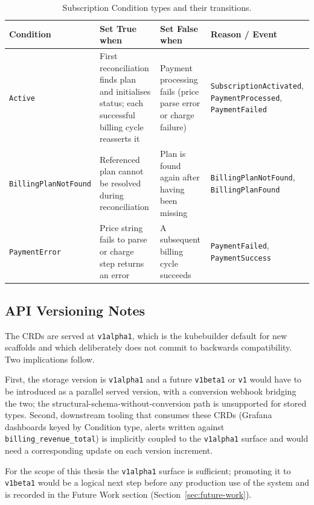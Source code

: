 \begin{table}[h]
\centering
\small
\caption{Subscription Condition types and their transitions.}
\label{tab:conditions}
\begin{tabularx}{\textwidth}{@{}lXXX@{}}
\toprule
\textbf{Condition} & \textbf{Set True when} & \textbf{Set False when} & \textbf{Reason / Event} \\ \midrule
\texttt{Active} &
First reconciliation finds plan and initialises status; each successful billing cycle reasserts it &
Payment processing fails (price parse error or charge failure) &
\texttt{SubscriptionActivated}, \texttt{PaymentProcessed}, \texttt{PaymentFailed} \\
\texttt{BillingPlanNotFound} &
Referenced plan cannot be resolved during reconciliation &
Plan is found again after having been missing &
\texttt{BillingPlanNotFound}, \texttt{BillingPlanFound} \\
\texttt{PaymentError} &
Price string fails to parse or charge step returns an error &
A subsequent billing cycle succeeds &
\texttt{PaymentFailed}, \texttt{PaymentSuccess} \\
\bottomrule
\end{tabularx}
\end{table}

\subsection{API Versioning Notes}

The CRDs are served at \texttt{v1alpha1}, which is the kubebuilder default for new scaffolds and which deliberately does not commit to backwards compatibility. Two implications follow.

First, the storage version is \texttt{v1alpha1} and a future \texttt{v1beta1} or \texttt{v1} would have to be introduced as a parallel served version, with a conversion webhook bridging the two; the structural-schema-without-conversion path is unsupported for stored types. Second, downstream tooling that consumes these CRDs (Grafana dashboards keyed by Condition type, alerts written against \texttt{billing\_revenue\_total}) is implicitly coupled to the \texttt{v1alpha1} surface and would need a corresponding update on each version increment.

For the scope of this thesis the \texttt{v1alpha1} surface is sufficient; promoting it to \texttt{v1beta1} would be a logical next step before any production use of the system and is recorded in the Future Work section (Section~\ref{sec:future-work}).

